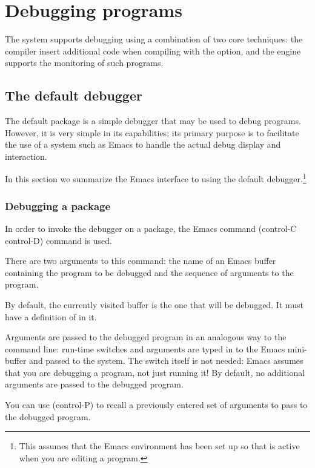 \chapter{Debugging \go programs}
\label{debugging}

The \go system supports debugging using a combination of two core techniques: the compiler insert additional code when compiling with the  option, and the \go engine supports the monitoring of such programs.

\section{The default debugger}
\label{debugger:default}
The default  package is a simple debugger that may be used to debug \go programs. However, it is very simple in its capabilities; its primary purpose is to facilitate the use of a system such as Emacs to handle the actual debug display and interaction.

In this section we summarize the Emacs interface to using the default debugger.\footnote{This assumes that the Emacs environment has been set up so that  is active when you are editing a \go program.}

\subsection{Debugging a package}
\label{debugger:emacs}
In order to invoke the debugger on a package, the Emacs command  (control-C control-D) command is used.

There are two arguments to this command: the name of an Emacs buffer containing the program to be debugged and the sequence of arguments to the program.

By default, the currently visited \go buffer is the one that will be debugged. It must have a definition of  in it.

Arguments are passed to the debugged program in an analogous way to the command line: run-time switches and arguments are typed in to the Emacs mini-buffer and passed to the \go system. The  switch itself is not needed: Emacs assumes that you are debugging a program, not just running it! By default, no additional arguments are passed to the debugged program.
\begin{aside}
You can use  (control-P) to recall a previously entered set of arguments to pass to the debugged program.
\end{aside}

